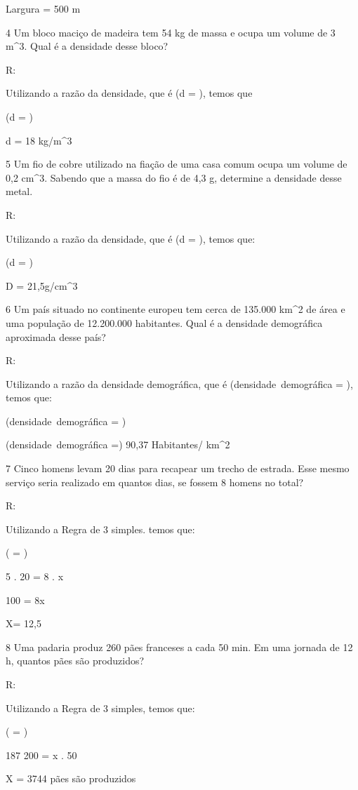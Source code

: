 {Largura = 500 m

\num{4} Um bloco maciço de madeira tem 54 kg de massa e ocupa um volume de 3
m^3. Qual é a densidade desse bloco?

R:

Utilizando a razão da densidade, que é (d = ), temos que

(d = )

d = 18 kg/m^3

\num{5} Um fio de cobre utilizado na fiação de uma casa comum ocupa um volume
de 0,2 cm^3. Sabendo que a massa do fio é de 4,3 g, determine a densidade
desse metal.

R:

Utilizando a razão da densidade, que é (d = ), temos que:

(d = )

D = 21,5g/cm^3

\num{6} Um país situado no continente europeu tem cerca de 135.000 km^2 de
área e uma população de 12.200.000 habitantes. Qual é a densidade
demográfica aproximada desse país?

R:

Utilizando a razão da densidade demográfica, que é
(densidade\ demográfica = ),
temos que:

(densidade\ demográfica = )

(densidade\ demográfica =) 90,37 Habitantes/ km^2

\num{7} Cinco homens levam 20 dias para recapear um trecho de estrada. Esse
mesmo serviço seria realizado em quantos dias, se fossem 8 homens no
total?

R:

Utilizando a Regra de 3 simples. temos que:

( = )

5 . 20 = 8 . x

100 = 8x

X= 12,5

\num{8} Uma padaria produz 260 pães franceses a cada 50 min. Em uma jornada
de 12 h, quantos pães são produzidos?

R:

Utilizando a Regra de 3 simples, temos que:

( = )

187 200 = x . 50

X = 3744 pães são produzidos

}
